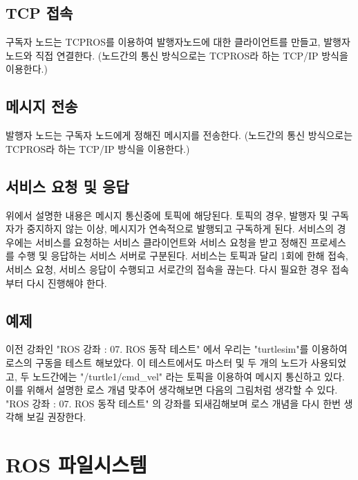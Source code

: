 \subsection{TCP 접속}

구독자 노드는 TCPROS를 이용하여 발행자노드에 대한 클라이언트를 만들고, 발행자노드와 직접 연결한다. (노드간의 통신 방식으로는 TCPROS라 하는 TCP/IP 방식을 이용한다.)

\subsection{메시지 전송}

발행자 노드는 구독자 노드에게 정해진 메시지를 전송한다. (노드간의 통신 방식으로는 TCPROS라 하는 TCP/IP 방식을 이용한다.)

\subsection{서비스 요청 및 응답}

위에서 설명한 내용은 메시지 통신중에 토픽에 해당된다. 토픽의 경우, 발행자 및 구독자가 중지하지 않는 이상, 메시지가 연속적으로 발행되고 구독하게 된다. 서비스의 경우에는 서비스를 요청하는 서비스 클라이언트와 서비스 요청을 받고 정해진 프로세스를 수행 및 응답하는 서비스 서버로 구분된다. 서비스는 토픽과 달리 1회에 한해 접속, 서비스 요청, 서비스 응답이 수행되고 서로간의 접속을 끊는다. 다시 필요한 경우 접속부터 다시 진행해야 한다. 

\subsection{예제}

이전 강좌인 "ROS 강좌 : 07. ROS 동작 테스트" 에서 우리는 "turtlesim"를 이용하여 로스의 구동을 테스트 해보았다. 이 테스트에서도 마스터 및 두 개의 노드가 사용되었고, 두 노드간에는 "/turtle1/cmd\_vel" 라는 토픽을 이용하여 메시지 통신하고 있다. 이를 위해서 설명한 로스 개념 맞추어 생각해보면 다음의 그림처럼 생각할 수 있다.  "ROS 강좌 : 07. ROS 동작 테스트" 의 강좌를 되새김해보며 로스 개념을 다시 한번 생각해 보길 권장한다.

\section{ROS 파일시스템}

